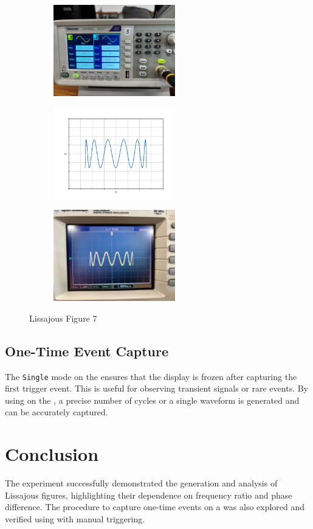 \documentclass[a4paper,12pt]{article}
\begin{document}
\begin{figure}[h!]
	\begin{subfigure}[b]{10pt}
		\includegraphics[width = 150pt]{figs/fig7.jpeg}
	\end{subfigure}
	\hspace{120pt}
	\begin{subfigure}[b]{10pt}
		\includegraphics[width = 150pt]{figs/fig7.png}
	\end{subfigure}
	\hspace{130pt}
	\begin{subfigure}[b]{10pt}
		\includegraphics[width = 150pt]{figs/fig7_1.jpeg}
	\end{subfigure}
	\caption{Lissajous Figure 7}
\end{figure}

\subsection*{One-Time Event Capture}
The \texttt{Single} mode on the  ensures that the display is frozen after capturing the first trigger event. This is useful for observing transient signals or rare events. By using  on the , a precise number of cycles or a single waveform is generated and can be accurately captured.

\section*{Conclusion}
The experiment successfully demonstrated the generation and analysis of Lissajous figures, highlighting their dependence on frequency ratio and phase difference. The procedure to capture one-time events on a  was also explored and verified using  with manual triggering.
\end{document}
